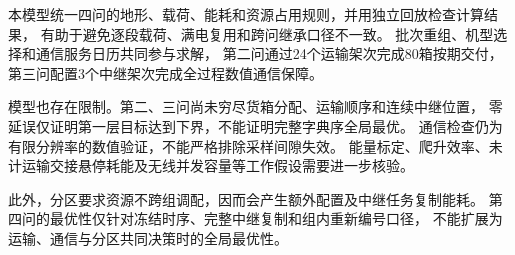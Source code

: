 本模型统一四问的地形、载荷、能耗和资源占用规则，并用独立回放检查计算结果，
有助于避免逐段载荷、满电复用和跨问继承口径不一致。
批次重组、机型选择和通信服务日历共同参与求解，
第二问通过24个运输架次完成80箱按期交付，
第三问配置3个中继架次完成全过程数值通信保障。

模型也存在限制。第二、三问尚未穷尽货箱分配、运输顺序和连续中继位置，
零延误仅证明第一层目标达到下界，不能证明完整字典序全局最优。
通信检查仍为有限分辨率的数值验证，不能严格排除采样间隙失效。
能量标定、爬升效率、未计运输交接悬停耗能及无线并发容量等工作假设需要进一步核验。

此外，分区要求资源不跨组调配，因而会产生额外配置及中继任务复制能耗。
第四问的最优性仅针对冻结时序、完整中继复制和组内重新编号口径，
不能扩展为运输、通信与分区共同决策时的全局最优性。
